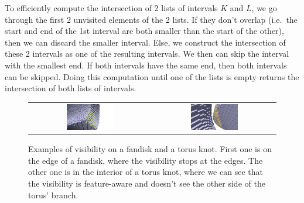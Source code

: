 \documentclass[runningheads]{llncs}
\begin{document}
    To efficiently compute the intersection of 2 lists of intervals $K$ and $L$, we go through the first 2 unvisited
    elements of the 2 lists. If they don't overlap (i.e.\ the start and end of the 1st interval are both smaller than
    the start of the other), then we can discard the smaller interval. Else, we construct the intersection of these
    2 intervals as one of the resulting intervals. We then can skip the interval with the smallest end. If both
    intervals have the same end, then both intervals can be skipped. Doing this computation until one of the lists
    is empty returns the intersection of both lists of intervals.


    \begin{figure}
        \centering
        \begin{tabular}{c c}
            \includegraphics[width=0.4\textwidth]{pictures/visibility_from_given_point_r_10} &
            \includegraphics[width=0.4\textwidth]{pictures/visibility_aware_of_features}
        \end{tabular}
        \caption{Examples of visibility on a fandisk and a torus knot. First one is on the edge
        of a fandisk, where the visibility stops at the edges. The other one is in the interior
        of a torus knot, where we can see that the visibility is feature-aware and doesn't see
        the other side of the torus' branch.}
        \label{fig:visibility-results}
    \end{figure}
%
\end{document}
